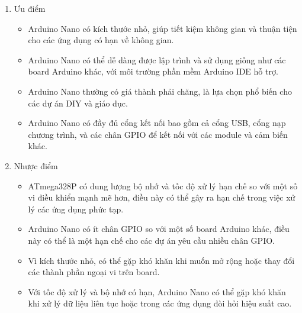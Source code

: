 
\begin{enumerate}[-]
    \item Ưu điểm
    \begin{itemize}
        \item Arduino Nano có kích thước nhỏ, giúp tiết kiệm không gian và thuận tiện cho các ứng dụng có hạn về không gian.
        \item Arduino Nano có thể dễ dàng được lập trình và sử dụng giống như các board Arduino khác, với môi trường phần mềm Arduino IDE hỗ trợ.
        \item Arduino Nano thường có giá thành phải chăng, là lựa chọn phổ biến cho các dự án DIY và giáo dục.
        \item Arduino Nano có đầy đủ cổng kết nối bao gồm cả cổng USB, cổng nạp chương trình, và các chân GPIO để kết nối với các module và cảm biến khác.
    \end{itemize}
    \item  Nhược điểm
    \begin{itemize}
        \item ATmega328P có dung lượng bộ nhớ và tốc độ xử lý hạn chế so với một số vi điều khiển mạnh mẽ hơn, điều này có thể gây ra hạn chế trong việc xử lý các ứng dụng phức tạp.
        \item Arduino Nano có ít chân GPIO so với một số board Arduino khác, điều này có thể là một hạn chế cho các dự án yêu cầu nhiều chân GPIO.
        \item Vì kích thước nhỏ, có thể gặp khó khăn khi muốn mở rộng hoặc thay đổi các thành phần ngoại vi trên board.
        \item Với tốc độ xử lý và bộ nhớ có hạn, Arduino Nano có thể gặp khó khăn khi xử lý dữ liệu liên tục hoặc trong các ứng dụng đòi hỏi hiệu suất cao.
    \end{itemize}
\end{enumerate}